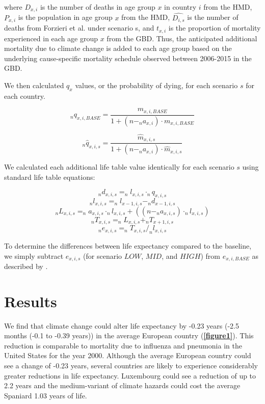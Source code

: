 \documentclass[12pt,]{article}
\begin{document}
where \(D_{x,i}\) is the number of deaths in age group \(x\) in country
\(i\) from the HMD, \(P_{x,i}\) is the population in age group \(x\)
from the HMD, \(\hat{D_{i,s}}\) is the number of deaths from Forzieri et
al. \citep{forzieri2017increasing} under scenario s, and \(t_{x,i}\) is
the proportion of mortality experienced in each age group \(x\) from the
GBD. Thus, the anticipated additional mortality due to climate change is
added to each age group based on the underlying cause-specific mortality
schedule observed between 2006-2015 in the GBD.

We then calculated \(q_x\) values, or the probability of dying, for each
scenario \(s\) for each country.

\begin{equation}
_nq_{x,i,BASE} = \frac{m_{x,i,BASE}}{1+(n-_na_{x,i}) \cdot m_{x,i,BASE}}
\end{equation}

\begin{equation}
_n\hat{q}_{x,i,s} = \frac{\hat{m}_{x,i,s}}{1+(n-_na_{x,i}) \cdot \hat{m}_{x,i,s}}
\end{equation}

We calculated each additional life table value identically for each
scenario \(s\) using standard life table equations:

\[_nd_{x,i,s} = _nl_{x,i,s} \cdot _nq_{x,i,s}\]
\[_nl_{x,i,s} = _nl_{x-1,i,s} - _nd_{x-1,i,s}\]
\[_nL_{x,i,s} = _na_{x,i,s} \cdot _nl_{x,i,s} + ((n-_na_{x,i,s}) \cdot _nl_{x,i,s})\]
\[_nT_{x,i,s} = _nL_{x,i,s} + _nT_{x+1,i,s}\]
\[_ne_{x,i,s} = _nT_{x,i,s} / _nl_{x,i,s}\]

To determine the differences between life expectancy compared to the
baseline, we simply subtract \(e_{x,i,s}\) (for scenario \(LOW\),
\(MID\), and \(HIGH\)) from \(e_{x,i,BASE}\) as described by
\citep{beltran2008integrated}.

\hypertarget{results}{%
\section{Results}\label{results}}

We find that climate change could alter life expectancy by -0.23 years
(-2.5 months (-0.1 to -0.39 years)) in the average European country
(\textbf{\autoref{figure1}}). This reduction is comparable to mortality
due to influenza and pneumonia \citep{arias2013united} in the United
States for the year 2000. Although the average European country could
see a change of -0.23 years, several countries are likely to experience
considerably greater reductions in life expectancy. Luxembourg could see
a reduction of up to 2.2 years and the medium-variant of climate hazards
could cost the average Spaniard 1.03 years of life.
\end{document}
